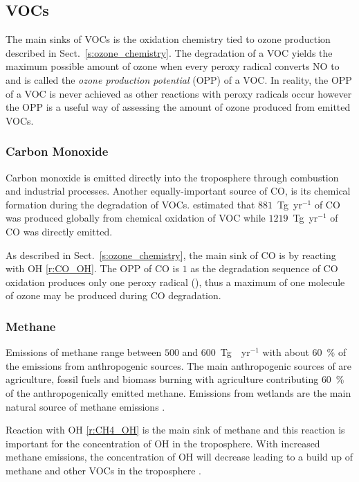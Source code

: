 \subsection{VOCs}
The main sinks of VOCs is the oxidation chemistry tied to ozone production described in Sect.~\ref{s:ozone_chemistry}.
The degradation of a VOC yields the maximum possible amount of ozone when every peroxy radical converts NO to  and is called the \emph{ozone production potential} (OPP) of a VOC.
In reality, the OPP of a VOC is never achieved as other reactions with peroxy radicals occur however the OPP is a useful way of assessing the amount of ozone produced from emitted VOCs.

\subsubsection{Carbon Monoxide}
Carbon monoxide is emitted directly into the troposphere through combustion and industrial processes.
Another equally-important source of CO, is its chemical formation during the degradation of VOCs.
\citet{Hauglustaine:1998} estimated that $881$~Tg~yr$^{-1}$ of CO was produced globally from chemical oxidation of VOC while $1219$~Tg~yr$^{-1}$ of CO was directly emitted.

As described in Sect.~\ref{s:ozone_chemistry}, the main sink of CO is by reacting with OH \eqref{r:CO_OH}.
The OPP of CO is $1$ as the degradation sequence of CO oxidation produces only one peroxy radical (), thus a maximum of one molecule of ozone may be produced during CO degradation.

\subsubsection{Methane}
Emissions of methane range between $500$ and $600$~Tg~~yr$^{-1}$ with about $60$~\% of the emissions from anthropogenic sources.
The main anthropogenic sources of  are agriculture, fossil fuels and biomass burning with agriculture contributing $60$~\% of the anthropogenically emitted methane.
Emissions from wetlands are the main natural source of methane emissions \citep{Kirschke:2013}.

Reaction with OH \eqref{r:CH4_OH} is the main sink of methane and this reaction is important for the concentration of OH in the troposphere.
With increased methane emissions, the concentration of OH will decrease leading to a build up of methane and other VOCs in the troposphere \citep{Holmes:2013}.

